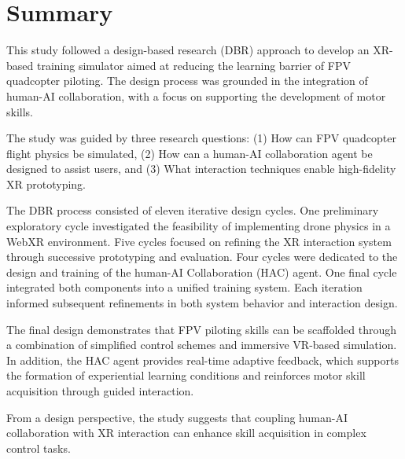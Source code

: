 \setcounter{secnumdepth}{0}
\newpage
\section{Summary}

This study followed a design-based research (DBR) approach to develop an XR-based training simulator aimed at reducing the learning barrier of FPV quadcopter piloting. The design process was grounded in the integration of human-AI collaboration, with a focus on supporting the development of motor skills.

The study was guided by three research questions: (1) How can FPV quadcopter flight physics be simulated, (2) How can a human-AI collaboration agent be designed to assist users, and (3) What interaction techniques enable high-fidelity XR prototyping.

The DBR process consisted of eleven iterative design cycles. One preliminary exploratory cycle investigated the feasibility of implementing drone physics in a WebXR environment. Five cycles focused on refining the XR interaction system through successive prototyping and evaluation. Four cycles were dedicated to the design and training of the human-AI Collaboration (HAC) agent. One final cycle integrated both components into a unified training system. Each iteration informed subsequent refinements in both system behavior and interaction design.

The final design demonstrates that FPV piloting skills can be scaffolded through a combination of simplified control schemes and immersive VR-based simulation. In addition, the HAC agent provides real-time adaptive feedback, which supports the formation of experiential learning conditions and reinforces motor skill acquisition through guided interaction.

From a design perspective, the study suggests that coupling human-AI collaboration with XR interaction can enhance skill acquisition in complex control tasks.

